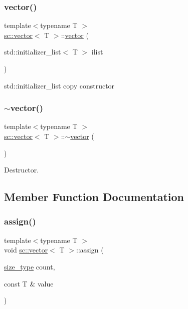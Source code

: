 \subsubsection{\texorpdfstring{vector()}{vector()}\hspace{0.1cm}{\footnotesize\ttfamily [5/5]}}
{\footnotesize\ttfamily template$<$typename T $>$ \\
\hyperlink{classsc_1_1vector}{sc\+::vector}$<$ T $>$\+::\hyperlink{classsc_1_1vector}{vector} (\begin{DoxyParamCaption}\item[{std\+::initializer\+\_\+list$<$ T $>$}]{ilist }\end{DoxyParamCaption})\hspace{0.3cm}{\ttfamily [inline]}}



std\+::initializer\+\_\+list copy constructor 

\mbox{\label{classsc_1_1vector_a024d736c8ec23f0bc187a4a0e59b2da5}} 
\subsubsection{\texorpdfstring{$\sim$vector()}{~vector()}}
{\footnotesize\ttfamily template$<$typename T $>$ \\
\hyperlink{classsc_1_1vector}{sc\+::vector}$<$ T $>$\+::$\sim$\hyperlink{classsc_1_1vector}{vector} (\begin{DoxyParamCaption}{ }\end{DoxyParamCaption})\hspace{0.3cm}{\ttfamily [inline]}}



Destructor. 



\subsection{Member Function Documentation}
\mbox{\label{classsc_1_1vector_aaa1279dfc147a016a70a65faa7d89c23}} 
\subsubsection{\texorpdfstring{assign()}{assign()}}
{\footnotesize\ttfamily template$<$typename T $>$ \\
void \hyperlink{classsc_1_1vector}{sc\+::vector}$<$ T $>$\+::assign (\begin{DoxyParamCaption}\item[{\hyperlink{classsc_1_1vector_aa4500ebad5be45f8d469fc4b5d62b19d}{size\+\_\+type}}]{count,  }\item[{const T \&}]{value }\end{DoxyParamCaption})}

